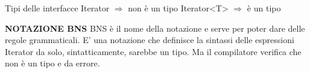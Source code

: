 \noindent Tipi delle interfacce \newline
Iterator $\Rightarrow$ non è un tipo \newline
Iterator<T> $\Rightarrow$ è un tipo 

\noindent \textbf{NOTAZIONE BNS} \newline
BNS è il nome della notazione e serve per poter dare delle regole grammaticali. E' una notazione che definisce la sintassi delle espressioni\newline
Iterator da solo, sintatticamente, sarebbe un tipo. Ma il compilatore verifica che non è un tipo e da errore.








\newpage 

